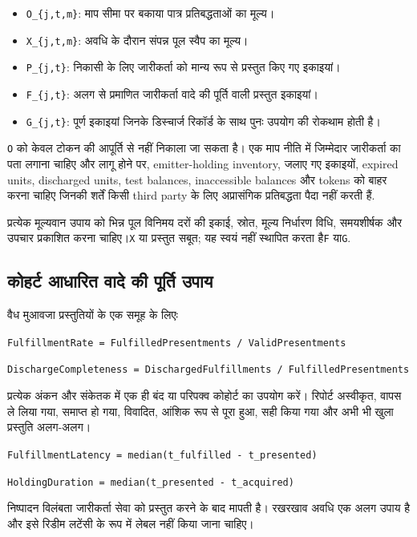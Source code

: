 \documentclass[11pt]{article}
\begin{document}
\begin{itemize}[leftmargin=*]
\item \texttt{O\_\{j,t,m\}}: माप सीमा पर बकाया पात्र प्रतिबद्धताओं का मूल्य।
\item \texttt{X\_\{j,t,m\}}: अवधि के दौरान संपन्न पूल स्वैप का मूल्य।
\item \texttt{P\_\{j,t\}}: निकासी के लिए जारीकर्ता को मान्य रूप से प्रस्तुत किए गए इकाइयां।
\item \texttt{F\_\{j,t\}}: अलग से प्रमाणित जारीकर्ता वादे की पूर्ति वाली प्रस्तुत इकाइयां।
\item \texttt{G\_\{j,t\}}: पूर्ण इकाइयां जिनके डिस्चार्ज रिकॉर्ड के साथ पुनः उपयोग की रोकथाम होती है।
\end{itemize}
\texttt{O} को केवल टोकन की आपूर्ति से नहीं निकाला जा सकता है। एक माप नीति में जिम्मेदार जारीकर्ता का पता लगाना चाहिए और लागू होने पर, emitter-holding inventory, जलाए गए इकाइयों, expired units, discharged units, test balances, inaccessible balances और tokens को बाहर करना चाहिए जिनकी शर्तें किसी third party के लिए अप्रासंगिक प्रतिबद्धता पैदा नहीं करती हैं.

प्रत्येक मूल्यवान उपाय को भिन्न पूल विनिमय दरों की इकाई, स्रोत, मूल्य निर्धारण विधि, समयशीर्षक और उपचार प्रकाशित करना चाहिए।\texttt{X} या प्रस्तुत सबूत; यह स्वयं नहीं स्थापित करता है\texttt{F} या\texttt{G}.

\subsection*{कोहर्ट आधारित वादे की पूर्ति उपाय}

वैध मुआवजा प्रस्तुतियों के एक समूह के लिएः

\texttt{FulfillmentRate = FulfilledPresentments / ValidPresentments}

\texttt{DischargeCompleteness = DischargedFulfillments / FulfilledPresentments}

प्रत्येक अंकन और संकेतक में एक ही बंद या परिपक्व कोहोर्ट का उपयोग करें। रिपोर्ट अस्वीकृत, वापस ले लिया गया, समाप्त हो गया, विवादित, आंशिक रूप से पूरा हुआ, सही किया गया और अभी भी खुला प्रस्तुति अलग-अलग।

\texttt{FulfillmentLatency = median(t\_fulfilled - t\_presented)}

\texttt{HoldingDuration = median(t\_presented - t\_acquired)}

निष्पादन विलंबता जारीकर्ता सेवा को प्रस्तुत करने के बाद मापती है। रखरखाव अवधि एक अलग उपाय है और इसे रिडीम लटेंसी के रूप में लेबल नहीं किया जाना चाहिए।
\end{document}
